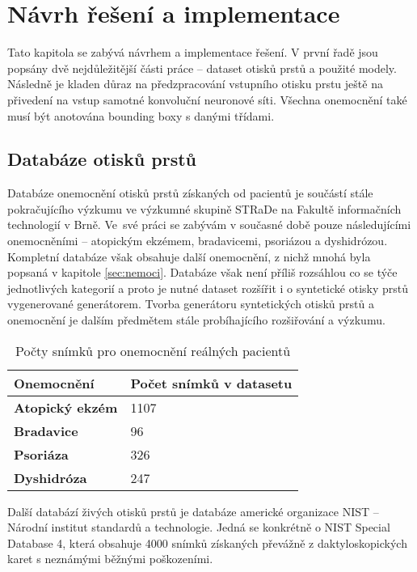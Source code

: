 \chapter{Návrh řešení a implementace}
Tato kapitola se zabývá návrhem a implementace řešení. V první řadě jsou popsány dvě nejdůležitější části práce -- dataset otisků prstů a použité modely. Následně je kladen důraz na předzpracování vstupního otisku prstu ještě na přivedení na vstup samotné konvoluční neuronové síti. Všechna onemocnění také musí být anotována bounding boxy s danými třídami.
\section{Databáze otisků prstů}
Databáze onemocnění otisků prstů získaných od pacientů je součástí stále pokračujícího výzkumu ve výzkumné skupině STRaDe na Fakultě informačních technologií v Brně. Ve~své práci se zabývám v současné době pouze následujícími onemocněními -- atopickým ekzémem, bradavicemi, psoriázou a dyshidrózou. Kompletní databáze však obsahuje další onemocnění, z nichž mnohá byla popsaná v kapitole \ref{sec:nemoci}. Databáze však není příliš rozsáhlou co se týče jednotlivých kategorií a proto je nutné dataset rozšířit i o syntetické otisky prstů vygenerované generátorem. Tvorba generátoru syntetických otisků prstů a onemocnění je dalším předmětem stále probíhajícího rozšiřování a výzkumu.

\begin{table}[!htbp]
\centering
\begin{tabular}{|l|l|}
\hline
\textbf{Onemocnění}     & \textbf{Počet snímků v datasetu} \\ \hline
\textbf{Atopický ekzém} & 1107                             \\ \hline
\textbf{Bradavice}      & 96                               \\ \hline
\textbf{Psoriáza}       & 326                              \\ \hline
\textbf{Dyshidróza}     & 247                              \\ \hline
\end{tabular}
\caption{Počty snímků pro onemocnění reálných pacientů}
\end{table}

Další databází živých otisků prstů je databáze americké organizace NIST -- Národní institut standardů a technologie. Jedná se konkrétně o NIST Special Database 4, která obsahuje 4000 snímků získaných převážně z daktyloskopických karet s neznámými běžnými poškozeními.

